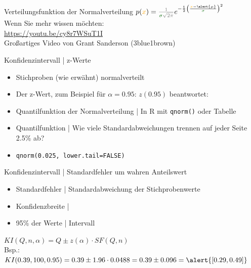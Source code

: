 \begin{frame}
  {Verteilungsfunktion der Normalverteilung}
  \onslide<+->
  \onslide<+->
  \centering 
  \LARGE
  \begin{math}
    p(\orongsch{x})=\grau{\frac{1}{\gruen{\sigma}\sqrt{2\pi}}}e^{-\frac{1}{2}\left(\frac{\orongsch{x}-\alert{\mu}}{\gruen{\sigma}}\right)^2}
  \end{math}\\
  \large
  \Doppelzeile
  Wenn Sie mehr wissen möchten:\\
  \url{https://youtu.be/cy8r7WSuT1I}\\
  Großartiges Video von Grant Sanderson (3blue1brown)
\end{frame}


\begin{frame}
  {Konfidenzintervall | z-Werte}
  \begin{itemize}[<+->]
    \item Stichproben (wie erwähnt) \alert{normalverteilt} 
    \item Der \alert{z-Wert}, zum Beispiel für $\alpha=0.95$: \alert{$z(0.95)$} beantwortet:\\
      \Zeile
    \item \alert{Quantilfunktion der Normalverteilung} | In R mit \alert{\texttt{qnorm()}} oder \alert{Tabelle}
    \item Quantilfunktion | Wie viele Standardabweichungen trennen auf jeder Seite 2.5\% ab?
    \item \alert{\texttt{qnorm(0.025, lower.tail=FALSE)}}  
  \end{itemize}
\end{frame}

\begin{frame}
  {Konfidenzintervall | Standardfehler um wahren Anteilswert}
  \begin{itemize}[<+->]
    \item Standardfehler | \alert{Standardabweichung} der Stichprobenwerte
    \item \alert{Konfidenzbreite} | 
    \item 95\% der Werte | Intervall 
  \end{itemize}
  \Doppelzeile
  \begin{center}
    \alert{$KI(Q,n,\alpha)=Q\pm z(\alpha)\cdot SF(Q,n)$}\\
    \Zeile
  Bsp.: $KI(0.39,100,0.95)=0.39\pm1.96\cdot 0.0488=0.39\pm0.096=\alert{[0.29, 0.49]}$
  \end{center}
\end{frame}

